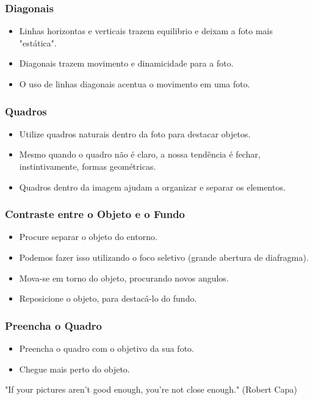 \begin{frame}
    \frametitle{Diagonais}
    \begin{itemize}
      \item Linhas horizontas e verticais trazem equilibrio e deixam a foto mais "estática".
      \item Diagonais trazem movimento e dinamicidade para a foto.
      \item O uso de linhas diagonais acentua o movimento em uma foto.
    \end{itemize}
\end{frame}

\begin{frame}
    \frametitle{Quadros}
    \begin{itemize}
      \item Utilize quadros naturais dentro da foto para destacar objetos.
      \item Mesmo quando o quadro não é claro, a nossa tendência é fechar, instintivamente,
      formas geométricas.
      \item Quadros dentro da imagem ajudam a organizar e separar os elementos.
    \end{itemize}
\end{frame}

\begin{frame}
    \frametitle{Contraste entre o Objeto e o Fundo}
    \begin{itemize}
      \item Procure separar o objeto do entorno.
      \item Podemos fazer isso utilizando o foco seletivo (grande abertura de diafragma).
      \item Mova-se em torno do objeto, procurando novos angulos.
      \item Reposicione o objeto, para destacá-lo do fundo.
    \end{itemize}
\end{frame}

\begin{frame}
    \frametitle{Preencha o Quadro}
    \begin{itemize}
      \item Preencha o quadro com o objetivo da sua foto.
      \item Chegue mais perto do objeto.
    \end{itemize}
    \begin{center}
      "If your pictures aren’t good enough, you’re not close enough." (Robert Capa)
    \end{center}
\end{frame}

